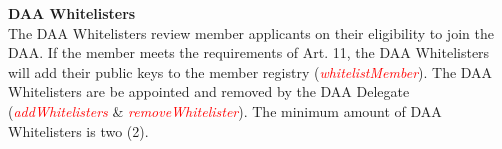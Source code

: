 \item \textbf{DAA Whitelisters} \\
The DAA Whitelisters review member applicants on their eligibility to join the DAA.
If the member meets the requirements of Art. 11, the DAA Whitelisters will add their public keys to the member registry (\textcolor{red}{\emph{whitelistMember}}).
The DAA Whitelisters are be appointed and removed by the DAA Delegate (\textcolor{red}{\emph{addWhitelisters}} \& \textcolor{red}{\emph{removeWhitelister}}).
The minimum amount of DAA Whitelisters is two (2).
